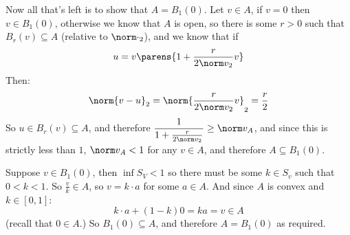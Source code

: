 \documentclass[10pt]{article}
\begin{document}
\begin{blankpp}
    Now all that's left is to show that $A=B_1(0)$.
    Let $v\in A$, if $v=0$ then $v\in B_1(0)$, otherwise we know that $A$ is open, so there is some $r>0$ such that
    $B_r(v)\subseteq A$ (relative to $\norm\cdot_2$), and we know that if
        \[ u=v\parens{1 + \frac{r}{2\norm v_2}v} \]
    Then:
        \[ \norm{v-u}_2 = \norm{\frac r{2\norm v_2}v}_2 = \frac r2 \]
    So $u\in B_r(v)\subseteq A$, and therefore $\dfrac{1}{1+\frac r{2\norm v_2}}\geq\norm v_A$, and since this is strictly less
    than $1$, $\norm v_A<1$ for any $v\in A$, and therefore $A\subseteq B_1(0)$.

    Suppose $v\in B_1(0)$, then $\inf S_V<1$ so there must be some $k\in S_v$ such that $0<k<1$.
    So $\frac vk\in A$, so $v=k\cdot a$ for some $a\in A$.
    And since $A$ is convex and $k\in[0,1]$:
        \[ k\cdot a + (1-k)0 = ka = v \in A \]
    (recall that $0\in A$.)
    So $B_1(0)\subseteq A$, and therefore $A=B_1(0)$ as required.

\end{blankpp}
\end{document}
